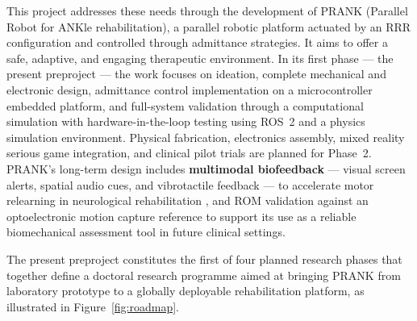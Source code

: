 This project addresses these needs through the development of PRANK (Parallel Robot for ANKle rehabilitation), a parallel robotic platform actuated by an RRR
configuration and controlled through admittance strategies. It aims to offer a safe, adaptive, and engaging therapeutic environment.
In its first phase — the present preproject — the work focuses on ideation, complete mechanical and electronic design, admittance control implementation on a microcontroller embedded platform, and full-system validation through a computational simulation with hardware-in-the-loop testing using ROS~2 and a physics simulation environment.
Physical fabrication, electronics assembly, mixed reality serious game integration, and clinical pilot trials are planned for Phase~2.
PRANK’s long-term design includes \textbf{multimodal biofeedback} — visual screen alerts, spatial audio cues, and vibrotactile feedback — to accelerate motor relearning in neurological rehabilitation \cite{Truijen2022}, and ROM validation against an optoelectronic motion capture reference to support its use as a reliable biomechanical assessment tool in future clinical settings.

The present preproject constitutes the first of four planned research phases that together define a doctoral research programme aimed at bringing PRANK from laboratory prototype to a globally deployable rehabilitation platform, as illustrated in Figure~\ref{fig:roadmap}.

